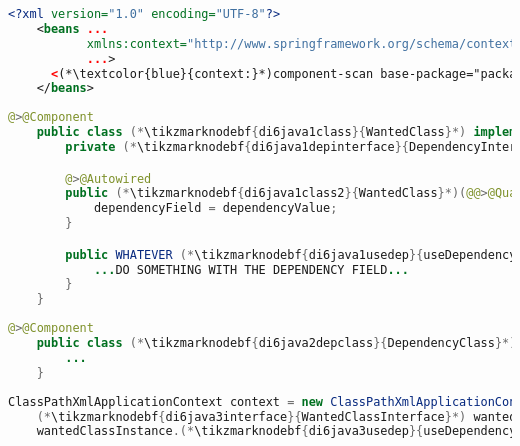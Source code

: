 \newline{}
\enlargethispage{20mm}
\thispagestyle{empty}
\begin{lstlisting}[language=XML, title={Configuration XML}]
    <?xml version="1.0" encoding="UTF-8"?>
    <beans ...
           xmlns:context="http://www.springframework.org/schema/context"
           ...>
      <(*\textcolor{blue}{context:}*)component-scan base-package="package.subfolder"/>
    </beans>
\end{lstlisting}
\begin{lstlisting}[language=Java, title={Wanted class with the constructor}]
    @>@Component
    public class (*\tikzmarknodebf{di6java1class}{WantedClass}*) implements (*\tikzmarknodebf{di6java1interface}{WantedClassInterface}*) {
        private (*\tikzmarknodebf{di6java1depinterface}{DependencyInterface}*) dependencyField;

        @>@Autowired
        public (*\tikzmarknodebf{di6java1class2}{WantedClass}*)(@@>@Qualifier<@@("(*\tikzmarknodebf{di6java1depbeanid}{dependencyClass}[ForestGreen]*)") (*\tikzmarknodebf{di6java1depinterface2}{DependencyInterface}*) dependencyValue) {
            dependencyField = dependencyValue;
        }

        public WHATEVER (*\tikzmarknodebf{di6java1usedep}{useDependency}*)() {
            ...DO SOMETHING WITH THE DEPENDENCY FIELD...
        }
    }
\end{lstlisting}
\begin{lstlisting}[language=Java, title={Dependency class}]
    @>@Component
    public class (*\tikzmarknodebf{di6java2depclass}{DependencyClass}*) implements (*\tikzmarknodebf{di6java2depinterface}{DependencyInterface}*) {
        ...
    }
\end{lstlisting}
\begin{lstlisting}[language=Java, title={Usage}]
    ClassPathXmlApplicationContext context = new ClassPathXmlApplicationContext("configurationFile.xml");
    (*\tikzmarknodebf{di6java3interface}{WantedClassInterface}*) wantedClassInstance = context.getBean("(*\tikzmarknodebf{di6java3beanid}{wantedClass}[ForestGreen]*)", (*\tikzmarknodebf{di6java3interface2}{WantedClassInterface}*).class);
    wantedClassInstance.(*\tikzmarknodebf{di6java3usedep}{useDependency}*)();
\end{lstlisting}
\newpage

